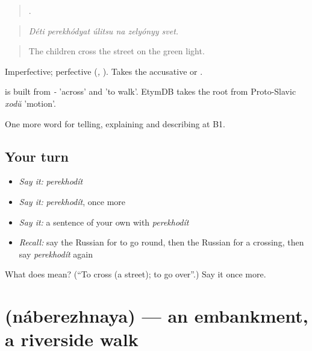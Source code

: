 \begin{quote}
     .
\end{quote}

\begin{quote}
\emph{Déti perekhódyat úlitsu na zelyónyy svet.}
\end{quote}

\begin{quote}
The children cross the street on the green light.
\end{quote}

Imperfective; perfective \emph{} (\emph{, }). Takes the accusative or \emph{}.

\begin{cousinweb}
\emph{} is built from \emph{-} 'across' and \emph{} 'to walk'. EtymDB takes the root from Proto-Slavic \emph{xodŭ} 'motion'.
\end{cousinweb}

\begin{grammarlens}[title={What you've built}]
One more word for telling, explaining and describing at B1.
\end{grammarlens}

\subsection*{Your turn}
\begin{itemize}
\raggedright
  \item \emph{Say it:} \emph{perekhodít}
  \item \emph{Say it:} \emph{perekhodít}, once more
  \item \emph{Say it:} a sentence of your own with \emph{perekhodít}
  \item \emph{Recall:} say the Russian for to go round, then the Russian for a crossing, then say \emph{perekhodít} again
\end{itemize}

\begin{tcolorbox}[breakable,colback=teal!4,colframe=teal!35!black,title={Before you move on}]
What does  mean? (\textquotedblleft{}To cross (a street); to go over\textquotedblright{}.) Say it once more.
\end{tcolorbox}
\section[\texorpdfstring{\ru{набережная} (náberezhnaya)}{набережная (náberezhnaya)}]{ (náberezhnaya) — an embankment, a riverside walk}

